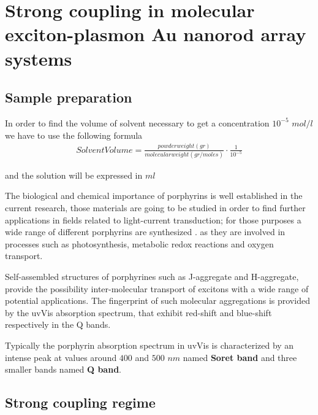 
\chapter{Strong coupling in molecular exciton-plasmon Au nanorod array systems} %

\label{Chapter2} %

\section{Sample preparation}

In order to find the volume of solvent necessary to get a concentration $10^{-5}$ $mol/l$ we have to use the following formula
\begin{eqnarray}
	Solvent Volume = \frac{powder weight (gr)}{molecular weight (gr/moles)}\cdot\frac{1}{10^{-5} }
\end{eqnarray}

and the solution will be expressed in $ml$


The biological and chemical importance of porphyrins is well established in the current research, those materials are going to be studied in order to find further applications in fields related to light-current transduction; for those purposes a wide range of different porphyrins are synthesized .
 as they are involved in processes such as photosynthesis, metabolic redox reactions and oxygen transport.
 
 Self-assembled structures of porphyrines such as J-aggregate and H-aggregate, provide the possibility inter-molecular transport of excitons with a wide range of potential applications. The fingerprint of such molecular aggregations is provided by the uvVis absorption spectrum, that exhibit red-shift and blue-shift respectively in the Q bands.
 
Typically the porphyrin absorption spectrum in uvVis is characterized by an intense peak at values around $400$ and $500$ $nm$ named {\bf Soret band} and three smaller bands named {\bf Q band}.
\section{Strong coupling regime}



